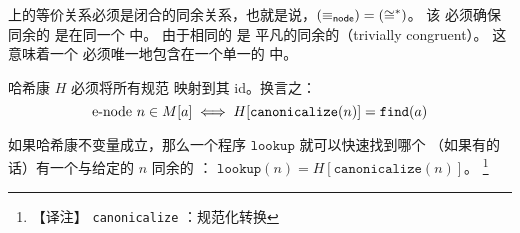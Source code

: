 \begin{definition}
  \label{def:cong-inv}
   \enodes 上的等价关系必须是闭合的同余关系，也就是说，$(\equiv_{\sf node}) = (\cong^{*})$。
  该 \egraph 必须确保同余的 \enodes 是在同一个 \eclass 中。
  由于相同的 \enodes 是 平凡的同余的（trivially congruent）。
   这意味着一个 \enode 必须唯一地包含在一个单一的 \eclass 中。
\end{definition}


\begin{definition} %
  \label{def:hash-inv}
  哈希康 $H$ 必须将所有规范 \enodes 映射到其 \eclass id。换言之：
  $$ \mbox{e-node}\ n \in M[a] \iff H[\texttt{canonicalize}(n)] = \texttt{find}(a) $$

  如果哈希康不变量成立，那么一个程序 $\texttt{lookup}$ 
    就可以快速找到哪个 \eclass （如果有的话）有一个与给定的 \enode $n$ 同余的 \enode ：
  $\texttt{lookup}(n) = H[\texttt{canonicalize}(n)]$。 \footnote{
     【译注】\; \texttt{canonicalize} ：规范化转换
    }
\end{definition}


